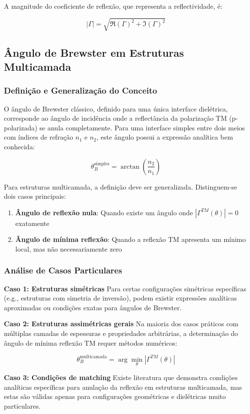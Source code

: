 \documentclass[11pt,a4paper]{article}
\begin{document}
A magnitude do coeficiente de reflexão, que representa a reflectividade, é:

\begin{equation}
|\Gamma| = \sqrt{\Re(\Gamma)^2 + \Im(\Gamma)^2}
\end{equation}

\subsection{Ângulo de Brewster em Estruturas Multicamada}

\subsubsection{Definição e Generalização do Conceito}

O ângulo de Brewster clássico, definido para uma única interface dielétrica, corresponde ao ângulo de incidência onde a reflectância da polarização TM (p-polarizada) se anula completamente. Para uma interface simples entre dois meios com índices de refração $n_1$ e $n_2$, este ângulo possui a expressão analítica bem conhecida:

\begin{equation}
\theta_B^{\text{simples}} = \arctan\left(\frac{n_2}{n_1}\right)
\end{equation}

Para estruturas multicamada, a definição deve ser generalizada. Distinguem-se dois casos principais:

\begin{enumerate}
\item \textbf{Ângulo de reflexão nula}: Quando existe um ângulo onde $|\Gamma^{TM}(\theta)| = 0$ exatamente
\item \textbf{Ângulo de mínima reflexão}: Quando a reflexão TM apresenta um mínimo local, mas não necessariamente zero
\end{enumerate}

\subsubsection{Análise de Casos Particulares}

\textbf{Caso 1: Estruturas simétricas}
Para certas configurações simétricas específicas (e.g., estruturas com simetria de inversão), podem existir expressões analíticas aproximadas ou condições exatas para ângulos de Brewster.

\textbf{Caso 2: Estruturas assimétricas gerais}
Na maioria dos casos práticos com múltiplas camadas de espessuras e propriedades arbitrárias, a determinação do ângulo de mínima reflexão TM requer métodos numéricos:

\begin{equation}
\theta_B^{\text{multicamada}} = \arg\min_{\theta} |\Gamma^{TM}(\theta)|
\end{equation}

\textbf{Caso 3: Condições de matching}
Existe literatura que demonstra condições analíticas específicas para anulação da reflexão em estruturas multicamada, mas estas são válidas apenas para configurações geométricas e dielétricas muito particulares.
\end{document}

